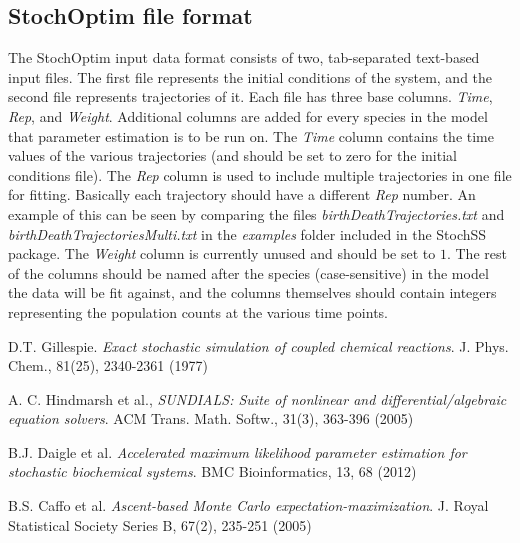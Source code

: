 \documentclass[12pt,notitlepage,nofootinbib]{revtex4}
\begin{document}
\subsection{StochOptim file format}
The StochOptim input data format consists of two, tab-separated text-based input files.
The first file represents the initial conditions of the system, and the second file represents trajectories of it.
Each file has three base columns. \textit{Time}, \textit{Rep}, and \textit{Weight}. Additional columns are added for every species in the model that parameter estimation is to be run on. The \textit{Time} column contains the time values of the various trajectories (and should be set to zero for the initial conditions file). The \textit{Rep} column is used to include multiple trajectories in one file for fitting. Basically each trajectory should have a different \textit{Rep} number. An example of this can be seen by comparing the files \textit{birthDeathTrajectories.txt} and \textit{birthDeathTrajectoriesMulti.txt} in the \textit{examples} folder included in the StochSS package. The \textit{Weight} column is currently unused and should be set to $1$. The rest of the columns should be named after the species (case-sensitive) in the model the data will be fit against, and the columns themselves should contain integers representing the population counts at the various time points.

\newpage

\begin{thebibliography}{9}
  
  D.T. Gillespie.
  \textit{Exact stochastic simulation of coupled chemical reactions}.
  J. Phys. Chem., 81(25), 2340-2361 (1977)
  
  A. C. Hindmarsh et al.,
  \textit{SUNDIALS: Suite of nonlinear and differential/algebraic equation solvers}.
  ACM Trans. Math. Softw., 31(3), 363-396 (2005)
  
  B.J. Daigle et al.
  \textit{Accelerated maximum likelihood parameter estimation for stochastic biochemical systems}.
  BMC Bioinformatics, 13, 68 (2012)
  
  B.S. Caffo et al.
  \textit{Ascent-based Monte Carlo expectation-maximization}. 
  J. Royal Statistical Society Series B, 67(2), 235-251 (2005)
  
\end{thebibliography}
\end{document}
